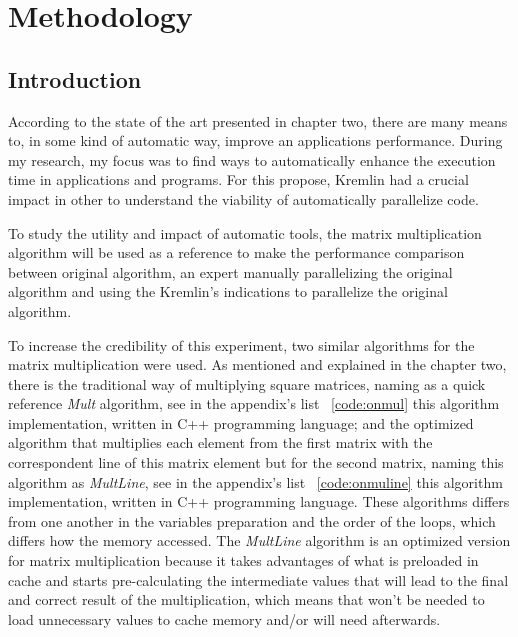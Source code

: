 \chapter{Methodology}\label{chap:chap4}

\section*{}



\section{Introduction}

According to the state of the art presented in chapter two, there are many means to, in some kind of automatic way, improve an applications performance. During my research, my focus was to find ways to automatically enhance the execution time in applications and programs. For this propose, Kremlin had a crucial impact in other to understand the viability of automatically parallelize code.

To study the utility and impact of automatic tools, the matrix multiplication algorithm will be used as a reference to make the performance comparison between original algorithm, an expert manually parallelizing the original algorithm and using the Kremlin's indications to parallelize the original algorithm.

To increase the credibility of this experiment, two similar algorithms for the matrix multiplication were used. As mentioned and explained in the chapter two, there is the traditional way of multiplying square matrices, naming as a quick reference \textit{Mult} algorithm, see in the appendix's list ~\ref{code:onmul} this algorithm implementation, written in C++ programming language; and the optimized algorithm that multiplies each element from the first matrix with the correspondent line of this matrix element but for the second matrix, naming this algorithm as \textit{MultLine}, see in the appendix's list ~\ref{code:onmuline} this algorithm implementation, written in C++ programming language. These algorithms differs from one another in the variables preparation and the order of the loops, which differs how the memory accessed. The \textit{MultLine} algorithm is an optimized version for matrix multiplication because it takes advantages of what is preloaded in cache and starts pre-calculating the intermediate values that will lead to the final and correct result of the multiplication, which means that won't be needed to load unnecessary values to cache memory and/or will need afterwards.  

